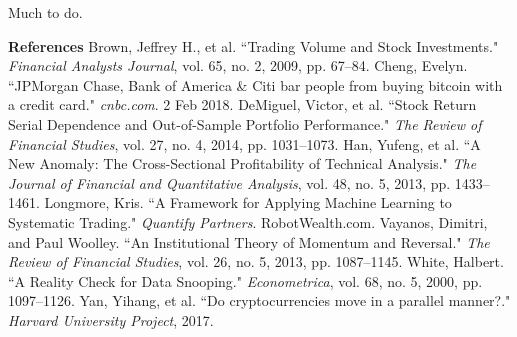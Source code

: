 \documentclass[12pt,twoside]{article}
\begin{document}
Much to do.

\newpage
{\large \textbf{References}}
\bigbreak
Brown, Jeffrey H., et al. ``Trading Volume and Stock Investments." \textit{Financial Analysts Journal}, vol. 65, no. 2, 2009, pp. 67–84.
\bigbreak
Cheng, Evelyn. ``JPMorgan Chase, Bank of America \& Citi bar people from buying bitcoin with a credit card." \textit{cnbc.com}. 2 Feb 2018.
\bigbreak
DeMiguel, Victor, et al. ``Stock Return Serial Dependence and Out-of-Sample Portfolio Performance." \textit{The Review of Financial Studies}, vol. 27, no. 4, 2014, pp. 1031–1073.
\bigbreak
Han, Yufeng, et al. ``A New Anomaly: The Cross-Sectional Profitability of Technical Analysis." \textit{The Journal of Financial and Quantitative Analysis}, vol. 48, no. 5, 2013, pp. 1433–1461.
\bigbreak
Longmore, Kris. ``A Framework for Applying Machine Learning to Systematic Trading." \textit{Quantify Partners}. RobotWealth.com.
\bigbreak
Vayanos, Dimitri, and Paul Woolley. ``An Institutional Theory of Momentum and Reversal." \textit{The Review of Financial Studies}, vol. 26, no. 5, 2013, pp. 1087–1145.
\bigbreak
White, Halbert. ``A Reality Check for Data Snooping." \textit{Econometrica}, vol. 68, no. 5, 2000, pp. 1097–1126.
\bigbreak
Yan, Yihang, et al. ``Do cryptocurrencies move in a parallel manner?." \textit{Harvard University Project}, 2017.
\bigbreak
\end{document}

